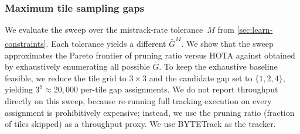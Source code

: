 
\subsubsection{Maximum tile sampling gaps}
\label{sec:ablation-constraints}

We evaluate the sweep over the mistrack-rate tolerance~$\bar{M}$ from \autoref{sec:learn-constraints}.
Each tolerance yields a different $\bar{G}^{\bar{M}}$.
We show that the sweep approximates the Pareto frontier of pruning ratio versus HOTA against obtained by exhaustively enumerating all possible $\bar{G}$.
To keep the exhaustive baseline feasible,
we reduce the tile grid to $3 \times 3$
and the candidate gap set to $\{1, 2, 4\}$,
yielding $3^9 \approx 20{,}000$ per-tile gap assignments.
We do not report throughput directly on this sweep,
because re-running full tracking execution on every assignment is prohibitively expensive;
instead,
we use the pruning ratio (fraction of tiles skipped)
as a throughput proxy.
We use BYTETrack as the tracker.


